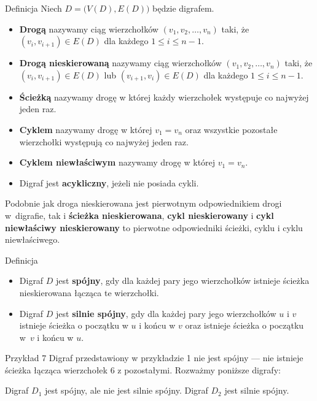 \documentclass[a4paper,10pt]{beamer}
\begin{document}
\begin{frame}	
	\begin{block}{Definicja}
		Niech $D=\big(V(D),E(D)\big)$ będzie digrafem.
\begin{itemize}
\item {\bf Drogą} nazywamy ciąg wierzchołków $(v_1,v_2,\ldots,v_n)$ taki, że $(v_i,v_{i+1})\in E(D)$ dla każdego $1\leq i\leq n-1$.
\item {\bf Drogą nieskierowaną} nazywamy ciąg wierzchołków $(v_1,v_2,\ldots,v_n)$ taki, że $(v_i,v_{i+1})\in E(D)$ lub $(v_{i+1},v_i)\in E(D)$ dla każdego $1\leq i\leq n-1$.
\item {\bf Ścieżką} nazywamy drogę w której każdy wierzchołek występuje co najwyżej jeden raz.
\item {\bf Cyklem} nazywamy drogę w której $v_1=v_n$ oraz wszystkie pozostałe wierzchołki występują co najwyżej jeden raz.
\item {\bf Cyklem niewłaściwym} nazywamy drogę w której $v_1=v_n$.
\item Digraf jest {\bf acykliczny}, jeżeli nie posiada cykli.
\end{itemize}
	\end{block}

\medskip

Podobnie jak droga nieskierowana jest pierwotnym odpowiednikiem drogi w~digrafie, tak i {\bf ścieżka nieskierowana}, {\bf cykl nieskierowany} i {\bf cykl niewłaściwy nieskierowany} to pierwotne odpowiedniki ścieżki, cyklu i cyklu niewłaściwego.

\end{frame}


\begin{frame}
	\begin{block}{Definicja}
	\begin{itemize}
	\item	Digraf $D$ jest {\bf spójny}, gdy dla każdej pary jego wierzchołków istnieje ścieżka nieskierowana łącząca te wierzchołki.
	\item Digraf $D$ jest {\bf silnie spójny}, gdy dla każdej pary jego wierzchołków $u$ i $v$ istnieje ścieżka o początku w $u$ i końcu w $v$ oraz istnieje ścieżka o początku w~$v$ i końcu w $u$.
	\end{itemize}
	\end{block}


\begin{exampleblock}{Przykład 7}
Digraf przedstawiony w przykładzie 1 nie jest spójny --- nie istnieje ścieżka łącząca wierzchołek $6$ z pozostałymi. Rozważmy poniższe digrafy:



Digraf $D_1$ jest spójny, ale nie jest silnie spójny. Digraf $D_2$ jest silnie spójny.
\end{exampleblock}
\end{frame}
\end{document}
